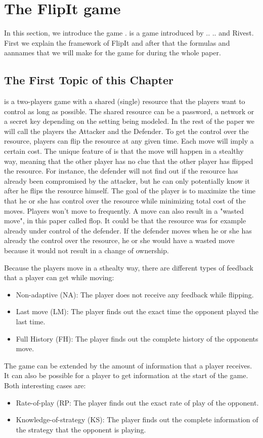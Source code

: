 \chapter{The FlipIt game}
\label{cha:2}
In this section, we introduce the game  \cite{FlipIt}.  is a game introduced by .. .. and Rivest. First we explain the framework of FlipIt and after that the formulas and aannames that we will make for the game for during the whole paper.  

\section{The First Topic of this Chapter}
 is a two-players game with a shared (single) resource that the players want to control as long as possible. The shared resource can be a password, a network or a secret key depending on the setting being modeled. In the rest of the paper we will call the players the Attacker and the Defender. To get the control over the resource, players can flip the resource at any given time. Each move will imply a certain cost. The unique feature of  is that the move will happen in a stealthy way, meaning that the other player has no clue that the other player has flipped the resource. For instance, the defender will not find out if the resource has already been compromised by the attacker, but he can only potentially know it after he flips the resource himself. The goal of the player is to maximize the time that he or she has control over the resource while minimizing total cost of the moves. Players won't move to frequently. A move can also result in a "wasted move", in this paper called flop. It could be that the resource was for example already under control of the defender. If the defender moves when he or she has already the control over the resource, he or she would have a wasted move because it would not result in a change of ownership. 
 
Because the players move in a sthealty way, there are different types of feedback that a player can get while moving:
\begin{itemize}
\item Non-adaptive (NA): The player does not receive any feedback while flipping.
\item Last move (LM): The player finds out the exact time the opponent played the last time.
\item Full History (FH): The player finds out the complete history of the opponents move.
\end{itemize}
The game can be extended by the amount of information that a player receives. It can also be possible for a player to get information at the start of the game. Both interesting cases are:
\begin{itemize}
\item Rate-of-play (RP: The player finds out the exact rate of play of the opponent.
\item Knowledge-of-strategy (KS): The player finds out the complete information of the strategy that the opponent is playing.
\end{itemize}

